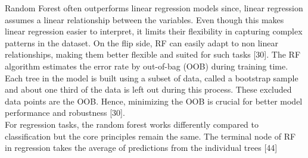 \documentclass[12pt,a4paper]{report}
\begin{document}
Random Forest often outperforms linear regression models since, linear regression assumes a linear relationship between the variables. Even though this makes linear regression easier to interpret, it limits their flexibility in capturing complex patterns in the dataset. 
On the flip side, RF can easily adapt to non linear relationships, making them better flexible and suited for such tasks [30]. The RF algorithm estimates the error rate by out-of-bag (OOB) during training time. Each tree in the model is built using a subset of data, called a 
bootstrap sample and about one third of the data is left out during this process. These excluded data points are the OOB. Hence, minimizing the OOB is crucial for better model performance and robustness [30]. \\


For regression tasks, the random forest works differently compared to classification but the core principles remain the same. The terminal node of RF in regression takes the average of predictions from the individual trees [44]
\end{document}
